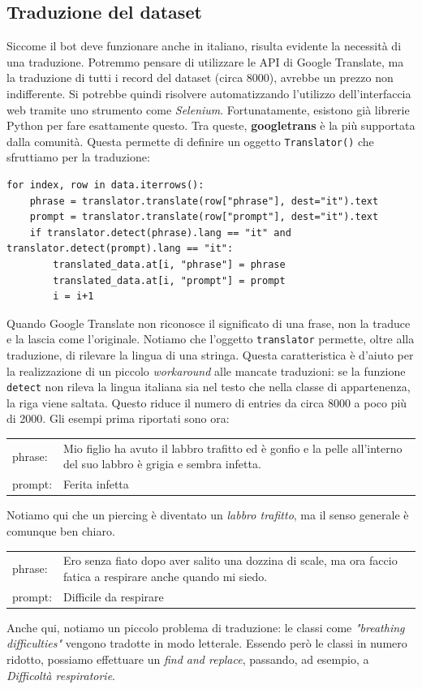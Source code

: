 \subsection{Traduzione del dataset}
Siccome il bot deve funzionare anche in italiano, risulta evidente la necessità di una traduzione. Potremmo pensare di utilizzare le API di Google Translate, ma la traduzione di tutti i record del dataset (circa 8000), avrebbe un prezzo non indifferente. Si potrebbe quindi risolvere automatizzando l'utilizzo dell'interfaccia web tramite uno strumento come \textit{Selenium}. Fortunatamente, esistono già librerie Python per fare esattamente questo. Tra queste, \textbf{googletrans} è la più supportata dalla comunità.
Questa permette di definire un oggetto \texttt{Translator()} che sfruttiamo per la traduzione:
\begin{verbatim}
for index, row in data.iterrows():
    phrase = translator.translate(row["phrase"], dest="it").text
    prompt = translator.translate(row["prompt"], dest="it").text
    if translator.detect(phrase).lang == "it" and translator.detect(prompt).lang == "it":
        translated_data.at[i, "phrase"] = phrase
        translated_data.at[i, "prompt"] = prompt
        i = i+1
\end{verbatim}
Quando Google Translate non riconosce il significato di una frase, non la traduce e la lascia come l'originale.
Notiamo che l'oggetto \texttt{translator} permette, oltre alla traduzione, di rilevare la lingua di una stringa. Questa caratteristica è d'aiuto per la realizzazione di un piccolo \textit{workaround} alle mancate traduzioni: se la funzione \texttt{detect} non rileva la lingua italiana sia nel testo che nella classe di appartenenza, la riga viene saltata. Questo riduce il numero di entries da circa 8000 a poco più di 2000. Gli esempi prima riportati sono ora:
\begin{table}[H]
    \begin{tabularx}{\textwidth}{|l|X|}
        phrase: & Mio figlio ha avuto il labbro trafitto ed è gonfio e la pelle all'interno del suo labbro è grigia e sembra infetta.
        \\
        prompt: & Ferita infetta
    \end{tabularx}
\end{table}
Notiamo qui che un piercing è diventato un \textit{labbro trafitto}, ma il senso generale è comunque ben chiaro.
\begin{table}[H]
    \begin{tabularx}{\textwidth}{|l|X|}
        phrase: & Ero senza fiato dopo aver salito una dozzina di scale, ma ora faccio fatica a respirare anche quando mi siedo.
        \\
        prompt: & Difficile da respirare
    \end{tabularx}
\end{table}
Anche qui, notiamo un piccolo problema di traduzione: le classi come \textit{"breathing difficulties"} vengono tradotte in modo letterale. Essendo però le classi in numero ridotto, possiamo effettuare un \textit{find and replace}, passando, ad esempio, a \textit{Difficoltà respiratorie}.
